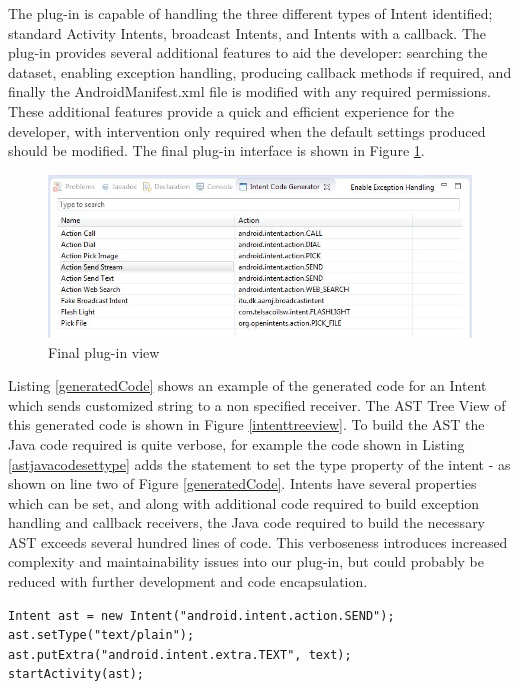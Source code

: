 The plug-in is capable of handling the three different types of Intent identified; standard Activity Intents, broadcast Intents, and Intents with a callback. The plug-in provides several additional features to aid the developer: searching the dataset, enabling exception handling, producing callback methods if required, and finally the AndroidManifest.xml file is modified with any required permissions. These additional features provide a quick and efficient experience for the developer, with intervention only required when the default settings produced should be modified. The final plug-in interface is shown in Figure \ref{codegeneratorview}.

\begin{figure}[t]
\label{codegeneratorview}
  \centering
    \includegraphics[width=\textwidth]{codegenerator}
  \caption{Final plug-in view}
\end{figure}

Listing \ref{generatedCode} shows an example of the generated code for an Intent which sends customized string to a non specified receiver. The AST Tree View of this generated code is shown in Figure \ref{intenttreeview}. To build the AST the Java code required is quite verbose, for example the code shown in Listing \ref{astjavacodesettype} adds the statement to set the type property of the intent - as shown on line two of Figure \ref{generatedCode}. Intents have several properties which can be set, and along with additional code required to build exception handling and callback receivers, the Java code required to build the necessary AST exceeds several hundred lines of code. This verboseness introduces increased complexity and maintainability issues into our plug-in, but could probably be reduced with further development and code encapsulation.

{\footnotesize\begin{lstlisting}[label=generatedCode,caption=Generated code of an Intent]
Intent ast = new Intent("android.intent.action.SEND");
ast.setType("text/plain");
ast.putExtra("android.intent.extra.TEXT", text);
startActivity(ast);		
\end{lstlisting}}

